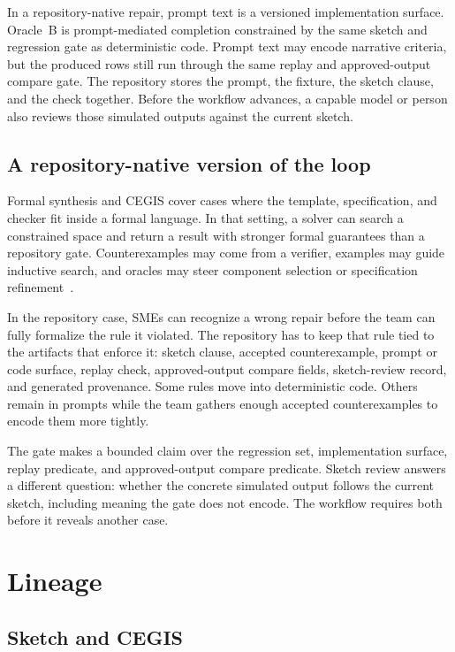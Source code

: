 \documentclass[11pt]{article}
\begin{document}
In a repository-native repair, prompt text is a versioned implementation surface.
Oracle~B is prompt-mediated completion constrained by the same sketch and regression gate as
deterministic code.  Prompt text may encode narrative criteria, but the produced rows still
run through the same replay and approved-output compare gate.  The repository stores the prompt, the
fixture, the sketch clause, and the check together.  Before the workflow advances, a capable
model or person also reviews those simulated outputs against the current sketch.

\subsection{A repository-native version of the loop}

Formal synthesis and CEGIS cover cases where the template, specification, and checker fit
inside a formal language.  In that setting, a solver can search a constrained space and
return a result with stronger formal guarantees than a repository gate.  Counterexamples may
come from a verifier, examples may guide inductive search, and oracles may steer component
selection or specification refinement~\cite{solar2006combinatorial,jha2010oracle}.

In the repository case, SMEs can recognize a wrong repair before the team can fully
formalize the rule it violated.  The repository has to keep that rule tied to the artifacts
that enforce it: sketch clause, accepted counterexample, prompt or code surface, replay check,
approved-output compare fields, sketch-review record, and generated provenance.  Some rules move into deterministic code.
Others remain in prompts while the team gathers enough accepted counterexamples to encode them
more tightly.

The gate makes a bounded claim over the regression set, implementation surface, replay
predicate, and approved-output compare predicate.  Sketch review answers a different question:
whether the concrete simulated output follows the current sketch, including meaning the gate
does not encode.  The workflow requires both before it reveals another case.

\section{Lineage}
\label{sec:lineage}

\subsection{Sketch and CEGIS}
\end{document}
